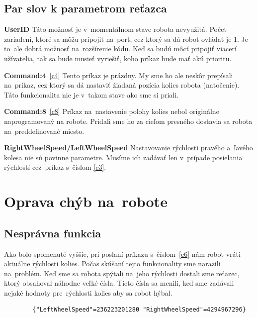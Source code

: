 \subsection{Par slov k parametrom reťazca}

\noindent \textbf{UserID} \newline
\indent Táto možnosť je v~momentálnom stave robota nevyužitá. Počet zariadení, ktoré sa môžu pripojiť na~port, cez ktorý sa dá robot ovládať je 1.
Je to~ale dobrá možnosť na~rozšírenie kódu. Keď sa budú môcť pripojiť viacerí užívatelia, tak sa bude musieť vyriešiť, koho príkaz bude mať
akú prioritu. \newline

\noindent \textbf{Command:4}~\ref{c4} \newline
\indent Tento príkaz je prázdny. My sme ho ale neskôr prepísali na~príkaz, cez ktorý sa dá nastaviť žiadaná pozícia kolies robota (natočenie).
Táto funkcionalita nie je v~takom stave ako sme si priali. \newline

\noindent \textbf{Command:8}~\ref{c8} \newline
\indent Príkaz na~nastavenie polohy kolies nebol originálne naprogramovaný na robote. Pridali sme ho za cieľom presného dostavia sa robota
na~preddefinované miesto. \newline

\noindent \textbf{RightWheelSpeed/LeftWheelSpeed} \newline
\indent Nastavovanie rýchlosti pravého a~ľavého kolesa nie sú povinne parametre. Musíme ich zadávať len v~prípade posielania rýchlostí cez~príkaz
s~číslom \ref{c3}.

\section{Oprava chýb na~robote}

\subsection{Nesprávna funkcia}
\indent Ako bolo spomenuté vyššie, pri poslaní príkazu s~číslom~\ref{c6} nám robot vráti aktuálne rýchlosti kolies. Počas skúšaní tejto funkcionality
sme narazili na~problém. Keď sme sa robota spýtali na~jeho rýchlosti dostali sme reťazec, ktorý obsahoval náhodne veľké čísla. Tieto čísla sa menili,
keď sme zadávali nejaké hodnoty pre~rýchlosti kolies aby sa robot hýbal.

\label{jsonWannabeSpeed}
\begin{lstlisting}
		{"LeftWheelSpeed"=236223201280 "RightWheelSpeed"=4294967296}
\end{lstlisting}

